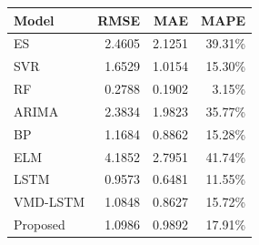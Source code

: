 {\tiny\setlength{\tabcolsep}{2pt}\begin{tabular}{lrrr} \toprule
Model & RMSE & MAE & MAPE \\ \midrule
ES & 2.4605 & 2.1251 & 39.31\% \\ 
SVR & 1.6529 & 1.0154 & 15.30\% \\ 
RF & 0.2788 & 0.1902 & 3.15\% \\ 
ARIMA & 2.3834 & 1.9823 & 35.77\% \\ 
BP & 1.1684 & 0.8862 & 15.28\% \\ 
ELM & 4.1852 & 2.7951 & 41.74\% \\ 
LSTM & 0.9573 & 0.6481 & 11.55\% \\ 
VMD-LSTM & 1.0848 & 0.8627 & 15.72\% \\ 
Proposed & 1.0986 & 0.9892 & 17.91\% \\ 
\bottomrule \end{tabular}}